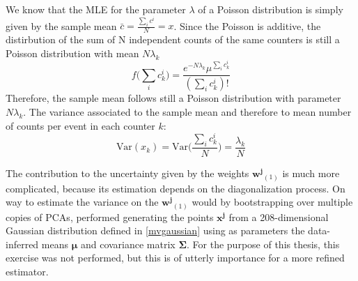  We know that the MLE for the parameter $\lambda$ of a Poisson distribution is simply given by the sample mean $\bar{c}=\frac{\sum_i c^i}{N}=x$. 
 Since the Poisson is additive, the distirbution of the sum of N independent counts of the same counters is still a Poisson distribution with mean $N\lambda_k$
 \begin{equation}
     f\bigl(\sum_i c^i_k\bigr) = \frac{e^{-N\lambda_k} \mu^{\sum_i c^i_k}}{(\sum_i c^i_k)!}
 \end{equation}
Therefore, the sample mean follows still a Poisson distribution with parameter $N\lambda_k$. The variance associated to the sample mean and therefore to mean number of counts per event in each counter $k$:
\begin{equation}
    \text{Var}(x_k) =\text{Var}\biggl(\frac{\sum_i c^i_k}{N}\biggr) = \frac{\lambda_k}{N}
\end{equation}

The contribution to the uncertainty given by the weights $\mathbf{w^j}_{(1)}$ is much more complicated, because its estimation depends on the diagonalization process. On way to estimate the variance on the $\mathbf{w^j}_{(1)}$ would by bootstrapping over multiple copies of PCAs, performed generating the points $\mathbf{x^{j}}$ from a 208-dimensional Gaussian distribution defined in \eqref{mvgaussian} using as parameters the data-inferred means $\mathbf{\mu}$ and covariance matrix $\mathbf{\Sigma}$.  For the purpose of this thesis, this exercise was not performed, but this is of utterly importance for a more refined estimator.

